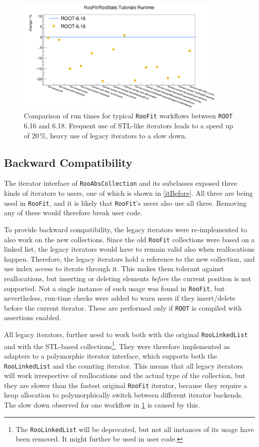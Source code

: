 \documentclass[a4paper]{jpconf}
\newcommand{\RooFit}{\texttt{RooFit}\xspace}
\newcommand{\ROOT}{\texttt{ROOT}\xspace}
\begin{document}
\begin{figure}[t]
\begin{center}
\includegraphics[trim=0 0 20mm 0,clip,width=0.9\textwidth]{tutorialsSpeed.png}
\end{center}
\caption{\label{speedupSTL}%
Comparison of run times for typical \RooFit workflows between \ROOT 6.16 and 6.18. Frequent use of STL-like iterators leads to a
speed up of $20\,\%$, heavy use of legacy iterators to a slow down.
}
\end{figure}

\subsection{Backward Compatibility}
The iterator interface of \texttt{RooAbsCollection} and its subclasses exposed three kinds of iterators to users, one of which
is shown in \cref{itBefore}. All three are being used in \RooFit, and it is likely that \RooFit's users also use all three.
Removing any of these would therefore break user code.

To provide backward compatibility, the legacy iterators were re-implemented to also work on the new collections. Since the old \RooFit
collections were based on a linked list, the legacy iterators would have to remain valid also when reallocations happen.
Therefore, the legacy iterators hold a reference to the new collection, and use index access to
iterate through it. This makes them tolerant against reallocations, but inserting or deleting elements \textit{before} the current
position is not supported. Not a single instance of such usage was found in \RooFit, but nevertheless, run-time checks were added
to warn users if they insert/delete before the current iterator. These are performed only if \ROOT is compiled with assertions enabled.

All legacy iterators, further need to work both with the original \texttt{RooLinkedList} and
with the STL-based collections\footnote{The \texttt{RooLinkedList} will be deprecated, but not all instances of its usage have been removed.
It might further be used in user code.}. They were therefore implemented as adapters to a polymorphic iterator interface, which
supports both the \texttt{RooLinkedList} and the counting iterator. This means that all legacy iterators will work irrespective of
reallocations and the actual type of the collection, but they are slower than the fastest original \RooFit iterator, because they
require a heap allocation to polymorphically switch between different iterator backends. The slow down observed for one workflow in
\cref{speedupSTL} is caused by this.
\end{document}
